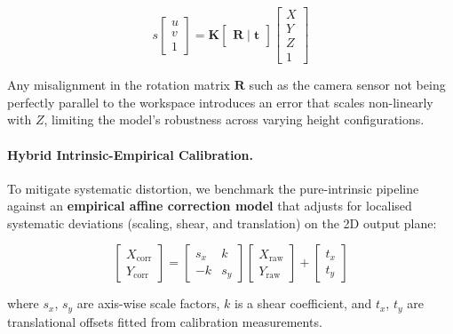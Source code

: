 \documentclass[12pt]{extarticle}
\begin{document}
\begin{equation}
    s \begin{bmatrix} u \\ v \\ 1 \end{bmatrix} = \mathbf{K} \begin{bmatrix} \mathbf{R} \mid \mathbf{t} \end{bmatrix} \begin{bmatrix} X \\ Y \\ Z \\ 1 \end{bmatrix}
    \label{eq:pinhole}
\end{equation}

Any misalignment in the rotation matrix $\mathbf{R}$ such as the camera sensor not being perfectly parallel to the workspace introduces an error that scales non-linearly with $Z$, limiting the model's robustness across varying height configurations.

\paragraph{Hybrid Intrinsic-Empirical Calibration.}

To mitigate systematic distortion, we benchmark the pure-intrinsic pipeline against an \textbf{empirical affine correction model} that adjusts for localised systematic deviations (scaling, shear, and translation) on the 2D output plane:

\begin{equation}
    \begin{bmatrix} X_{\text{corr}} \\ Y_{\text{corr}} \end{bmatrix} = \begin{bmatrix} s_x & k \\ -k & s_y \end{bmatrix} \begin{bmatrix} X_{\text{raw}} \\ Y_{\text{raw}} \end{bmatrix} + \begin{bmatrix} t_x \\ t_y \end{bmatrix}
    \label{eq:empirical}
\end{equation}

where $s_x$, $s_y$ are axis-wise scale factors, $k$ is a shear coefficient, and $t_x$, $t_y$ are translational offsets fitted from calibration measurements.
\end{document}
